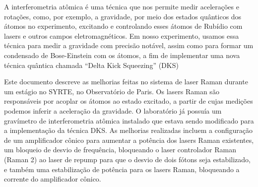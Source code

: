 


A interferometria atômica é uma técnica que nos permite medir acelerações e rotações, como, por exemplo, a gravidade, por meio dos estados quânticos dos átomos no experimento, excitando e controlando esses átomos de Rubídio com lasers e outros campos eletromagnéticos. Em nosso experimento, usamos essa técnica para medir a gravidade com precisão notável, assim como para formar um condensado de Bose-Einstein com os átomos, a fim de implementar uma nova técnica quântica chamada ``Delta Kick Squeezing'' (DKS)

Este documento descreve as melhorias feitas no sistema de laser Raman durante um estágio no SYRTE, no Observatório de Paris. Os lasers Raman são responsáveis por acoplar os átomos ao estado excitado, a partir de cujas medições podemos inferir a aceleração da gravidade. O laboratório já possuía um gravímetro de interferometria atômica instalado que estava sendo modificado para a implementação da técnica DKS. As melhorias realizadas incluem a configuração de um amplificador cônico para aumentar a potência dos lasers Raman existentes, um bloqueio de desvio de frequência, bloqueando o laser controlador Raman (Raman 2) ao laser de repump para que o desvio de dois fótons seja estabilizado, e também uma estabilização de potência para os lasers Raman, bloqueando a corrente do amplificador cônico.

